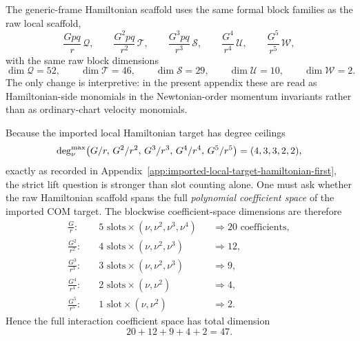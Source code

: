 \documentclass[11pt]{article}
\begin{document}
The generic-frame Hamiltonian scaffold uses the same formal block families as the
raw local scaffold,
\begin{equation}
\frac{Gpq}{r}\,\mathcal Q,
\qquad
\frac{G^2pq}{r^2}\,\mathcal T,
\qquad
\frac{G^3pq}{r^3}\,\mathcal S,
\qquad
\frac{G^4}{r^4}\,\mathcal U,
\qquad
\frac{G^5}{r^5}\,\mathcal W,
\label{eq:app-4pn-hamiltonian-lift-block-families}
\end{equation}
with the same raw block dimensions
\begin{equation}
\dim\mathcal Q=52,
\qquad
\dim\mathcal T=46,
\qquad
\dim\mathcal S=29,
\qquad
\dim\mathcal U=10,
\qquad
\dim\mathcal W=2.
\label{eq:app-4pn-hamiltonian-lift-raw-dims}
\end{equation}
The only change is interpretive: in the present appendix these are read as
Hamiltonian-side monomials in the Newtonian-order momentum invariants rather
than as ordinary-chart velocity monomials.

Because the imported local Hamiltonian target has degree ceilings
\begin{equation}
\deg_{\nu}^{\rm max}
\bigl(G/r,\,G^2/r^2,\,G^3/r^3,\,G^4/r^4,\,G^5/r^5\bigr)
=
(4,3,3,2,2),
\label{eq:app-4pn-hamiltonian-lift-degree-ceilings}
\end{equation}
exactly as recorded in
Appendix~\ref{app:imported-local-target-hamiltonian-first}, the strict lift
question is stronger than slot counting alone.  One must ask whether the raw
Hamiltonian scaffold spans the full \emph{polynomial coefficient space} of the
imported COM target.  The blockwise coefficient-space dimensions are therefore
\begin{equation}
\begin{aligned}
\frac{G}{r}:&\quad 5\text{ slots}\times(\nu,\nu^2,\nu^3,\nu^4)
&&\Rightarrow 20\text{ coefficients},\\
\frac{G^2}{r^2}:&\quad 4\text{ slots}\times(\nu,\nu^2,\nu^3)
&&\Rightarrow 12,\\
\frac{G^3}{r^3}:&\quad 3\text{ slots}\times(\nu,\nu^2,\nu^3)
&&\Rightarrow 9,\\
\frac{G^4}{r^4}:&\quad 2\text{ slots}\times(\nu,\nu^2)
&&\Rightarrow 4,\\
\frac{G^5}{r^5}:&\quad 1\text{ slot}\times(\nu,\nu^2)
&&\Rightarrow 2.
\end{aligned}
\label{eq:app-4pn-hamiltonian-lift-coefficient-space}
\end{equation}
Hence the full interaction coefficient space has total dimension
\begin{equation}
20+12+9+4+2=47.
\label{eq:app-4pn-hamiltonian-lift-total-rank-target}
\end{equation}
\end{document}
